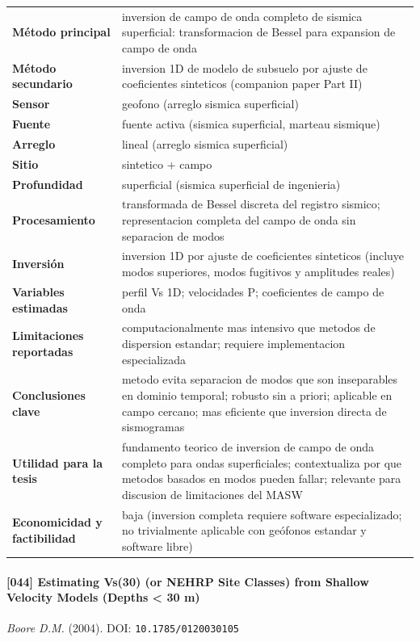 \begin{center}\scriptsize
\begin{tabularx}{\textwidth}{@{}>{\bfseries}p{3.3cm} X@{}}
\toprule
M\'etodo principal & inversion de campo de onda completo de sismica superficial: transformacion de Bessel para expansion de campo de onda \\
M\'etodo secundario & inversion 1D de modelo de subsuelo por ajuste de coeficientes sinteticos (companion paper Part II) \\
Sensor & geofono (arreglo sismica superficial) \\
Fuente & fuente activa (sismica superficial, marteau sismique) \\
Arreglo & lineal (arreglo sismica superficial) \\
Sitio & sintetico + campo \\
Profundidad & superficial (sismica superficial de ingenieria) \\
Procesamiento & transformada de Bessel discreta del registro sismico; representacion completa del campo de onda sin separacion de modos \\
Inversi\'on & inversion 1D por ajuste de coeficientes sinteticos (incluye modos superiores, modos fugitivos y amplitudes reales) \\
Variables estimadas & perfil Vs 1D; velocidades P; coeficientes de campo de onda \\
Limitaciones reportadas & computacionalmente mas intensivo que metodos de dispersion estandar; requiere implementacion especializada \\
Conclusiones clave & metodo evita separacion de modos que son inseparables en dominio temporal; robusto sin a priori; aplicable en campo cercano; mas eficiente que inversion directa de sismogramas \\
Utilidad para la tesis & fundamento teorico de inversion de campo de onda completo para ondas superficiales; contextualiza por que metodos basados en modos pueden fallar; relevante para discusion de limitaciones del MASW \\
Economicidad y factibilidad & baja (inversion completa requiere software especializado; no trivialmente aplicable con geófonos estandar y software libre) \\
\bottomrule
\end{tabularx}
\end{center}

\paragraph{[044] Estimating Vs(30) (or NEHRP Site Classes) from Shallow Velocity Models (Depths < 30 m)} \emph{Boore D.M.} (2004).
{\scriptsize DOI: \texttt{10.1785/0120030105}}

